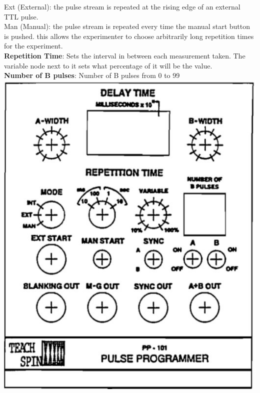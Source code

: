 \documentclass{article}
\begin{document}
{\begin{multicols}{2}
Ext (External): the pulse stream is repeated at the rising edge of an external TTL pulse. \\
Man (Manual): the pulse stream is repeated every time the manual start button is pushed. this allows the experimenter to choose arbitrarily long repetition times for the experiment. \\
\textbf{Repetition Time}: Sets the interval in between each measurement taken. 
The variable node next to it sets what percentage of it will be the value. \\
\textbf{Number of B pulses}: Number of B pulses from 0 to 99
\center
\includegraphics[width=\linewidth]{pic-de-manual/primerpanel.jpg}
\label{fig:10}
\justify

\end{multicols}}
\end{document}
